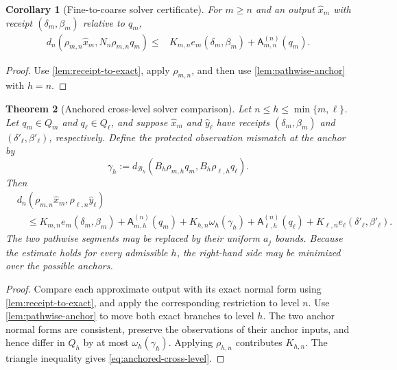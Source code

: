 \documentclass[11pt]{article}
\newtheorem{theorem}{Theorem}[section]
\newtheorem{corollary}[theorem]{Corollary}
\theoremstyle{definition}
\theoremstyle{remark}
\numberwithin{equation}{section}
\newcommand{\cB}{\mathcal B}
\begin{document}
\begin{corollary}[Fine-to-coarse solver certificate]
\label{cor:fine-to-coarse-solver}
For $m\ge n$ and an output $\widehat x_m$ with receipt
$(\delta_m,\beta_m)$ relative to $q_m$,
\[
\begin{split}
 d_n\!\left(
 \rho_{m,n}\widehat x_m,
 N_n\rho_{m,n}q_m
 \right)
 \le{}&
 K_{m,n}e_m(\delta_m,\beta_m)
 +\mathsf A_{m,n}^{(n)}(q_m).
\end{split}
\]
\end{corollary}

\begin{proof}
Use \cref{lem:receipt-to-exact}, apply $\rho_{m,n}$, and then use
\cref{lem:pathwise-anchor} with $h=n$.
\end{proof}

\begin{theorem}[Anchored cross-level solver comparison]
\label{thm:anchored-cross-level}
Let $n\le h\le\min\{m,\ell\}$.  Let $q_m\in Q_m$ and
$q_\ell\in Q_\ell$, and suppose $\widehat x_m$ and $\widehat y_\ell$
have receipts $(\delta_m,\beta_m)$ and
$(\delta'_\ell,\beta'_\ell)$, respectively.  Define the protected
observation mismatch at the anchor by
\[
 \gamma_h
 :=
 d_{\cB_h}\!\left(
 B_h\rho_{m,h}q_m,
 B_h\rho_{\ell,h}q_\ell
 \right).
\]
Then
\begin{equation}\label{eq:anchored-cross-level}
\begin{split}
&d_n\!\left(
 \rho_{m,n}\widehat x_m,
 \rho_{\ell,n}\widehat y_\ell
 \right)
\\
&\quad\le
 K_{m,n}e_m(\delta_m,\beta_m)
 +\mathsf A_{m,h}^{(n)}(q_m)
 +K_{h,n}\omega_h(\gamma_h)
 +\mathsf A_{\ell,h}^{(n)}(q_\ell)
 +K_{\ell,n}e_\ell(\delta'_\ell,\beta'_\ell).
\end{split}
\end{equation}
The two pathwise segments may be replaced by their uniform $a_j$ bounds.
Because the estimate holds for every admissible $h$, the right-hand side may
be minimized over the possible anchors.
\end{theorem}

\begin{proof}
Compare each approximate output with its exact normal form using
\cref{lem:receipt-to-exact}, and apply the corresponding restriction to
level $n$.  Use \cref{lem:pathwise-anchor} to move both exact branches to
level $h$.  The two anchor normal forms are consistent, preserve the
observations of their anchor inputs, and hence differ in $Q_h$ by at most
$\omega_h(\gamma_h)$.  Applying $\rho_{h,n}$ contributes $K_{h,n}$.
The triangle inequality gives \eqref{eq:anchored-cross-level}.
\end{proof}
\end{document}
